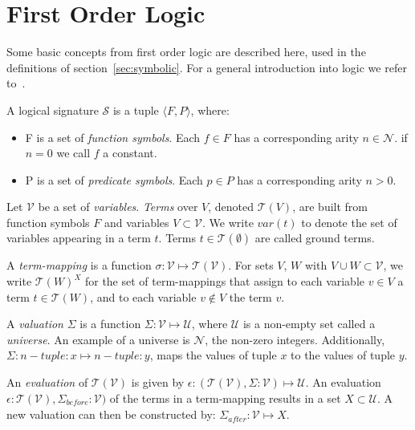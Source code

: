 \section{First Order Logic}\label{sec:first_order_logic}

Some basic concepts from first order logic are described here, used in the definitions of section~\ref{sec:symbolic}. For a general introduction into logic we refer to~\cite{Huth:logic}.
\\
\begin{definition}
A logical signature $\mathcal{S}$ is a tuple $\langle F, P \rangle$, where:
\begin{itemize}
 \item F is a set of \textit{function symbols}. Each $f\in F$ has a corresponding arity $n\in \mathcal{N}$. if $n = 0$ we call $f$ a constant.
 \item P is a set of \textit{predicate symbols}. Each $p\in P$ has a corresponding arity $n > 0$.
\end{itemize}
\end{definition}
 
Let $\mathcal{V}$ be a set of \textit{variables}. \textit{Terms} over $V$, denoted $\mathcal{T}(V)$, are built from function symbols $F$ and variables $V \subset \mathcal{V}$. We write $var(t)$ to denote the set of variables appearing in a term $t$. Terms $t\in \mathcal{T}(\emptyset)$ are called ground terms.

A \textit{term-mapping} is a function $\sigma:\mathcal{V} \mapsto \mathcal{T}(\mathcal{V})$. For sets $V$, $W$ with $V \cup W \subset \mathcal{V}$, we write $\mathcal{T}(W)^X$ for the set of term-mappings that assign to each variable $v\in V$ a term $t\in \mathcal{T}(W)$, and to each variable $v \not\in V$ the term $v$.

A \textit{valuation} $\Sigma$ is a function $\Sigma:\mathcal{V} \mapsto \mathcal{U}$, where $\mathcal{U}$ is a non-empty set called a \textit{universe}. An example of a universe is $\mathcal{N}$, the non-zero integers. Additionally, $\Sigma:\mathit{n-tuple:x} \mapsto \mathit{n-tuple:y}$, maps the values of tuple $x$ to the values of tuple $y$.

An \textit{evaluation} of $\mathcal{T}(\mathcal{V})$ is given by $\epsilon:(\mathcal{T}(\mathcal{V}),\Sigma:\mathcal{V}) \mapsto \mathcal{U}$. An evaluation $\epsilon:\mathcal{T}(\mathcal{V}),\Sigma_\mathit{before}:\mathcal{V})$ of the terms in a term-mapping results in a set $X \subset \mathcal{U}$. A new valuation can then be constructed by: $\Sigma_\mathit{after}:\mathcal{V} \mapsto X$.
